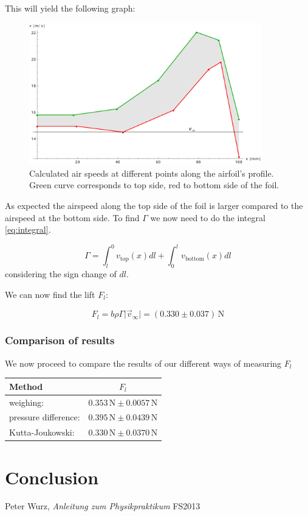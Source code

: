 \documentclass{scrreprt}
\newcommand{\unit}[1]{\ensuremath{\, \mathrm{#1}}}
\begin{document}
This will yield the following graph:

\begin{figure}[H]
	\centering
  \includegraphics[width=0.9\textwidth]{diag/kutta-joukowsky.pdf}
	\caption{Calculated air speeds at different points along the airfoil's profile. Green curve corresponds to top side, red to bottom side of the foil.}
	\label{fig:kutta}
\end{figure}

As expected the airspeed along the top side of the foil is larger compared to the airspeed at the bottom side. To find $\Gamma$ we now need to do the integral \ref{eq:integral}.

\begin{equation}
\Gamma = \int_l^0 v_{\text{top}}(x) dl + \int_0^l v_{\text{bottom}}(x) dl
\end{equation}
considering the sign change of $dl$.

We can now find the lift $F_l$:

\begin{equation}
F_l = b \rho \Gamma \lvert \vec{v}_\infty \rvert = (0.330 \pm 0.037) \unit{N}
\end{equation}

\subsubsection{Comparison of results}

We now proceed to compare the results of our different ways of measuring $F_l$
\begin{table}[H]
\centering
\begin{tabular}{|l|c|}
\hline
Method & $F_l$\\
\hline\hline
weighing: & $0.353 \unit{N} \pm 0.0057 \unit{N}$\\ 
pressure difference: & $0.395 \unit{N} \pm 0.0439 \unit{N}$\\
Kutta-Joukowski: & $0.330 \unit{N} \pm 0.0370 \unit{N}$\\
\hline
\end{tabular}
\end{table}


\section{Conclusion}

\begin{thebibliography}{9}

  Peter Wurz,
  \emph{Anleitung zum Physikpraktikum}
  FS2013

\end{thebibliography}
\end{document}
